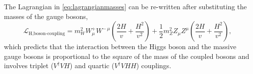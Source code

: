 The Lagrangian in \cref{eq:lagrangianmasses} can be re-written after substituting the masses of the gauge bosons,
\begin{equation}
  \mathcal{L}_{\text{H,boson-coupling}} = m_W^2 W_\mu^+W^{-\,\mu} \left( \frac{2H}{v} + \frac{H^2}{v^2} \right) + \frac{1}{2} m_Z^2 Z_\mu Z^\mu \left( \frac{2H}{v} + \frac{H^2}{v^2} \right),
  \label{eq:higgsbosoncoupling}
\end{equation}
which predicts that the interaction between the Higgs boson and the massive gauge bosons is proportional to the square of the mass of the coupled bosons and involves triplet ($V^\dagger VH$) and quartic ($V^\dagger VHH$) couplings.


